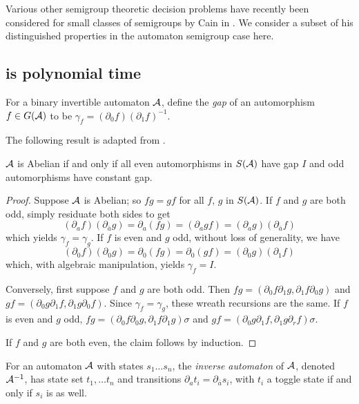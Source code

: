 \documentclass[11pt, titlepage]{article}
\begin{document}
Various other semigroup theoretic decision problems have recently been
considered for small classes of semigroups by Cain in
\cite{Cain09:dec_prob}. We consider a subset of his distinguished
properties in the automaton semigroup case here.


\subsection{ is polynomial time}

For a binary invertible automaton $\mathcal{A}$, define the \emph{gap} of an
automorphism $f \in G(\mathcal{A})$ to be
$\gamma_f = (\partial_0 f)(\partial_1 f)^{-1}$.

The following result is adapted from \cite{okano:thesis}.

\begin{lemma}
$\mathcal{A}$ is Abelian if and only if all even automorphisms
in $S(\mathcal{A})$ have gap $I$ and odd automorphisms have constant gap.
\end{lemma}

\begin{proof}
Suppose $\mathcal{A}$ is Abelian; so $fg = gf$ for all $f$, $g$ in $S(\mathcal{A})$.
If $f$ and $g$ are both odd, simply residuate both sides to get
\[
  (\partial_a f)(\partial_{\bar{a}}g) =
  \partial_a (fg) =
  (\partial_a gf) =
  (\partial_a g)(\partial_{\bar{a}}f)
\]
which yields $\gamma_f = \gamma_g$. If $f$ is even and $g$ odd, without loss of generality, we have
\[
  (\partial_0f)(\partial_0 g) = 
  \partial_0(fg) =
  \partial_0(gf) =
  (\partial_0g)(\partial_1 f)
\]
which, with algebraic manipulation, yields $\gamma_f = I$.

Conversely, first suppose $f$ and $g$ are both odd. Then
$fg = (\partial_0 f \partial_1 g, \partial_1 f \partial_0 g)$ and
$gf = (\partial_0 g \partial_1 f, \partial_1 g \partial_0 f)$. Since
$\gamma_f = \gamma_g$, these wreath recursions are the same. If $f$ is
even and $g$ odd,
$fg = (\partial_0f \partial_0g, \partial_1 f \partial_1 g)\sigma$ and
$gf = (\partial_0g \partial_1f, \partial_1 g \partial_r f)\sigma$.

If $f$ and $g$ are both even, the claim follows by induction.
\end{proof}

\begin{definition}
  For an automaton $\mathcal{A}$ with states $s_1 \ldots s_n$, the
  \emph{inverse automaton} of $\mathcal{A}$, denoted $\mathcal{A}^{-1}$, has state set
  $t_1, \ldots t_n$ and transitions
  $\partial_a t_i = \partial_{\bar{a}} s_i$, with $t_i$ a toggle state
  if and only if $s_i$ is as well.
\end{definition}
\end{document}
